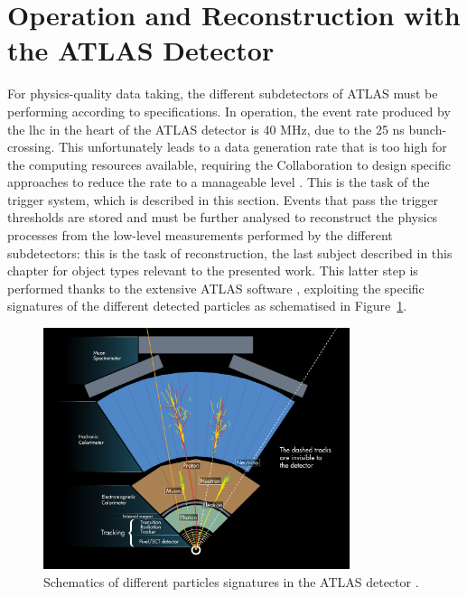 \section{Operation and Reconstruction with the ATLAS Detector}\label{chap-atlas-reco}
For physics-quality data taking, the different subdetectors of ATLAS must be performing according to specifications. In operation, the event rate produced by the \gls{lhc} in the heart of the ATLAS detector is 40 MHz, due to the 25 ns bunch-crossing. This unfortunately leads to a data generation rate that is too high for the computing resources available, requiring the Collaboration to design specific approaches to reduce the rate to a manageable level \cite{Nedden_2017}. This is the task of the trigger system, which is described in this section. Events that pass the trigger thresholds are stored and must be further analysed to reconstruct the physics processes from the low-level measurements performed by the different subdetectors: this is the task of reconstruction, the last subject described in this chapter for object types relevant to the presented work. This latter step is performed thanks to the extensive ATLAS software \cite{ATL-SOFT-PUB-2021-001, ATL-SOFT-PUB-2020-001}, exploiting the specific signatures of the different detected particles as schematised in Figure~\ref{fig-ATLASdetect}.

\begin{figure}[!h]
  \centering
  \includegraphics[width=0.8\textwidth]{Images/ATLAS/ATLASdetection.jpg}
  \caption{Schematics of different particles signatures in the ATLAS detector \cite{Pequenao:1505342}.}
  \label{fig-ATLASdetect}
\end{figure}

